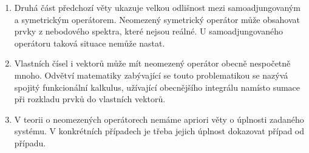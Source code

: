 \begin{remark}\qquad
\begin{enumerate}
    \item Druhá část předchozí věty ukazuje velkou odlišnost mezi samoadjungovaným a symetrickým operátorem. Neomezený symetrický operátor může obsahovat prvky z nebodového spektra, které nejsou reálné. U samoadjungovaného operátoru taková situace nemůže nastat.
    \item Vlastních čísel i vektorů může mít neomezený operátor obecně nespočetně mnoho. Odvětví matematiky zabývající se touto problematikou se nazývá spojitý funkcionální kalkulus, užívající obecnějšího integrálu namísto sumace při rozkladu prvků do vlastních vektorů.
    \item V teorii o neomezených operátorech nemáme apriori věty o úplnosti zadaného systému. V konkrétních případech je třeba jejich úplnost dokazovat případ od případu.
\end{enumerate}
\end{remark}











\pagebreak